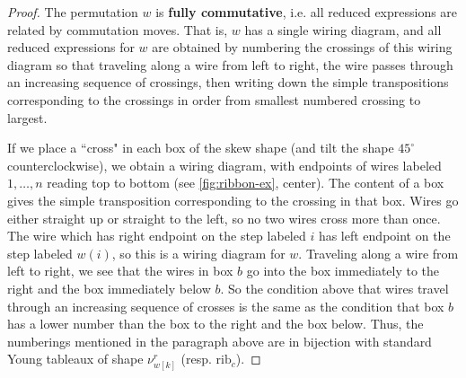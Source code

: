 \documentclass[11pt]{amsart}
\theoremstyle{definition}
\newcommand{\MSB}[1]{\textcolor{violet}{[MSB: #1]}}
\newcommand\defn[1]{{\bf #1}}
\def\pbolic^#1{^{<#1>}}
\def\bw{\mathbf{w}}
\def\rib_#1{\mathrm{rib}_{#1}}
\def\skew{\nu}
\begin{document}
\begin{proof}
	The permutation $w$ is \defn{fully commutative}, i.e. all reduced expressions are related by commutation moves. That is, $w$ has a single wiring diagram, and all reduced expressions for $w$ are obtained by numbering the crossings of this wiring diagram so that traveling along a wire from left to right, the wire passes through an increasing sequence of crossings, then writing down the simple transpositions corresponding to the crossings in order from smallest numbered crossing to largest. 
	
	If we place a ``cross" in each box of the skew shape (and tilt the shape $45^\circ$ counterclockwise), we obtain a wiring diagram, with endpoints of wires labeled $1, \dots, n$ reading top to bottom (see \cref{fig:ribbon-ex}, center). The content of a box gives the simple transposition corresponding to the crossing in that box. Wires go either straight up or straight to the left, so no two wires cross more than once. The wire which has right endpoint on the step labeled $i$ has left endpoint on the step labeled $w(i)$, so this is a wiring diagram for $w$. 
	Traveling along a wire from left to right, we see that the wires in box $b$ go into the box immediately to the right and the box immediately below $b$. So the condition above that wires travel through an increasing sequence of crosses is the same as the condition that box $b$ has a lower number than the box to the right and the box below. Thus, the numberings mentioned in the paragraph above are in bijection with standard Young tableaux of shape $\skew_{w[k]}^r$ (resp. $\rib_c$).

\end{proof}
\end{document}
